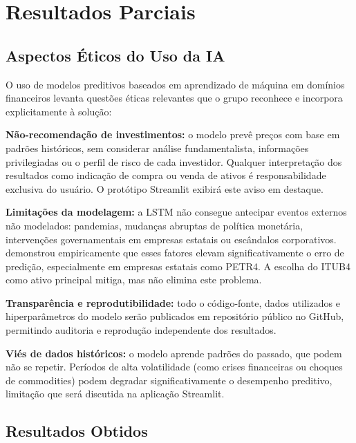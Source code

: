 \documentclass[12pt]{article}
\begin{document}
\section{Resultados Parciais}

\subsection{Aspectos Éticos do Uso da IA}

O uso de modelos preditivos baseados em aprendizado de máquina em domínios
financeiros levanta questões éticas relevantes que o grupo reconhece e
incorpora explicitamente à solução:

\textbf{Não-recomendação de investimentos:} o modelo prevê preços com base
em padrões históricos, sem considerar análise fundamentalista, informações
privilegiadas ou o perfil de risco de cada investidor. Qualquer interpretação
dos resultados como indicação de compra ou venda de ativos é responsabilidade
exclusiva do usuário. O protótipo Streamlit exibirá este aviso em destaque.

\textbf{Limitações da modelagem:} a LSTM não consegue antecipar eventos
externos não modelados: pandemias, mudanças abruptas de política monetária,
intervenções governamentais em empresas estatais ou escândalos corporativos.
\cite{zanotto:2026} demonstrou empiricamente que esses fatores elevam
significativamente o erro de predição, especialmente em empresas estatais como
PETR4. A escolha do ITUB4 como ativo principal mitiga, mas não elimina
este problema.

\textbf{Transparência e reprodutibilidade:} todo o código-fonte, dados
utilizados e hiperparâmetros do modelo serão publicados em repositório público
no GitHub, permitindo auditoria e reprodução independente dos resultados.

\textbf{Viés de dados históricos:} o modelo aprende padrões do passado, que
podem não se repetir. Períodos de alta volatilidade (como crises financeiras
ou choques de commodities) podem degradar significativamente o desempenho
preditivo, limitação que será discutida na aplicação Streamlit.

\subsection{Resultados Obtidos}
\end{document}
